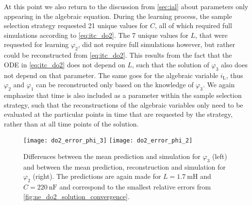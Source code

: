 \documentclass[AMA,STIX1COL]{WileyNJD-v2}
\newcommand{\mr}[1]{\mathrm{#1}}
\begin{document}
At this point we also return to the discussion from \autoref{sec:ial} about parameters only appearing in the algebraic equation. During the learning process, the sample selection strategy requested 21 unique values for $C$, all of which required full simulations according to \eqref{eq:itc_do2}. The 7 unique values for $L$, that were requested for learning $\varphi_2$, did not require full simulations however, but rather could be reconstructed from \eqref{eq:itc_do2}. This results from the fact that the ODE in \eqref{eq:itc_do2} does not depend on $L$, such that the solution of $\varphi_3$ also does not depend on that parameter. The same goes for the algebraic variable $i_\mr{L}$, thus $\varphi_2$ and $\varphi_1$ can be reconstructed only based on the knowledge of $\varphi_3$. We again emphasize that time is also included as a parameter within the sample selection strategy, such that the reconstructions of the algebraic variables only need to be evaluated at the particular points in time that are requested by the strategy, rather than at all time points of the solution.
\begin{figure}[t]
    \begin{center}
        \texttt{[image: do2\_error\_phi\_3]} \hspace{1.5cm} \texttt{[image: do2\_error\_phi\_2]}
    \end{center}
    \caption{Differences between the mean prediction and simulation for $\varphi_3$ (left) and between the mean prediction, reconstruction and simulation for $\varphi_2$ (right). The predictions are again made for $L = \SI{1.7}{\milli\henry}$ and $C = \SI{220}{\nano\farad}$ and correspond to the smallest relative errors from \autoref{fig:ne_do2_solution_convergence}.}
    \label{fig:ne_do2_error}
\end{figure}
\end{document}
